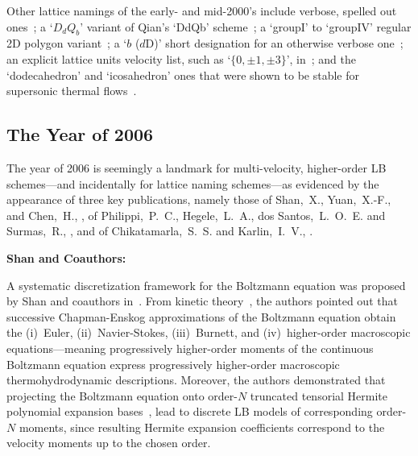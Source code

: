     Other     lattice     namings     of     the     early-     and     mid-2000's     include     verbose,     spelled      out
    ones~\cite{2001-dHumieresD+LallemandP-PhysRevE,   2005-LuXY-IntJModPhysC};   a   `$D_dQ_b$'   variant   of   Qian's   `DdQb'
    scheme~\cite{2003-NourgalievRR+JosephD-IntJMulFlow};     a     `groupI'     to     `groupIV'     regular     2D      polygon
    variant~\cite{2003-WatariM+TsutaharaM-PhysRevE, 2007-WatariM-PhysA}; a `$b$  ($d$D)'  short  designation  for  an  otherwise
    verbose one~\cite{2006-ChikatamarlaSS+KarlinIV-PhysRevLett}; an explicit lattice units velocity list, such as `$\{0, \pm  1,
    \pm 3\}$', in~\cite{2006-ChikatamarlaSS+KarlinIV-PhysRevLett}; and the `dodecahedron' and `icosahedron' ones that were shown
    to be stable for supersonic thermal flows~\cite{2006-WatariM+TsutaharaM-PhysA, 2007-WatariM-PhysA}.

    \subsection{The Year of 2006}

    The year of 2006 is seemingly a landmark for multi-velocity, higher-order LB schemes---and incidentally for  lattice  naming
    schemes---as evidenced by the appearance of three key publications, namely those of  Shan,~X.,  Yuan,~X.-F.,  and  Chen,~H.,
    \cite{2006-ShanX+ChenH-JFluidMech},   of   Philippi,~P.~C.,   Hegele,~L.~A.,   dos    Santos,~L.~O.~E.    and    Surmas,~R.,
    \cite{2006-PhilippiPC+SurmasR-PhysRevE},        and        of         Chikatamarla,~S.~S.         and         Karlin,~I.~V.,
    \cite{2006-ChikatamarlaSS+KarlinIV-PhysRevLett}.


    \vspace{2.0mm}\noindent\textbf{Shan and Coauthors:}\vspace{1.0mm}

    A  systematic   discretization   framework   for   the   Boltzmann   equation   was   proposed   by   Shan   and   coauthors
    in~\cite{2006-ShanX+ChenH-JFluidMech}.  From  kinetic  theory~\cite{2011-HarrisS-Dover,   2003-LiboffRL-bookSpringer},   the
    authors pointed out  that  successive  Chapman-Enskog  approximations  of  the  Boltzmann  equation  obtain  the  (i)~Euler,
    (ii)~Navier-Stokes, (iii)~Burnett, and (iv)~high\-er-or\-der macroscopic equations---meaning progressively  high\-er-or\-der
    moments  of  the  continuous  Boltzmann  equation  express  progressively  high\-er-or\-der  macroscopic  thermohydrodynamic
    descriptions. Moreover, the authors demonstrated that projecting the Boltzmann equation onto order-$N$  truncated  tensorial
    Hermite polynomial expansion bases~\cite{1949-GradH-CommPureApplMath}, lead  to  discrete  LB  models  of  corres\-pon\-ding
    order-$N$ moments, since resulting Hermite expansion coefficients correspond to the velocity moments up to the chosen order.

